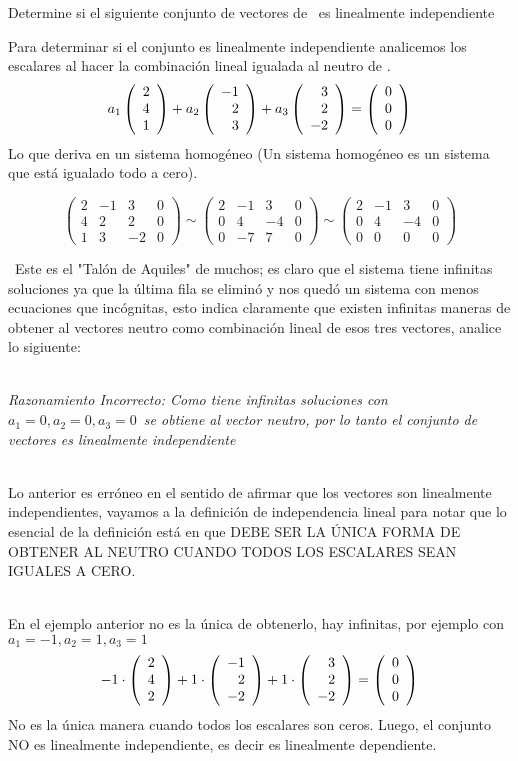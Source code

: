 \begin{ejemplo}
Determine si el siguiente conjunto de vectores de \rtres\ es linealmente independiente 
\end{ejemplo}
Para determinar si el conjunto es linealmente independiente analicemos los escalares al hacer la combinaci\'on lineal igualada al neutro de \rtres.
\[
a_1\left( \begin{array}{r} 2\\ 4\\ 1 \end{array} \right) +
a_2\left( \begin{array}{r} -1\\ 2\\ 3 \end{array} \right) +
a_3\left( \begin{array}{r} 3\\ 2\\ -2 \end{array} \right) =
\left( \begin{array}{r} 0\\ 0\\ 0 \end{array} \right) 
\]
Lo que deriva en un sistema homog\'eneo (Un sistema homog\'eneo es un sistema que est\'a igualado todo a cero).

\[
\left(
\begin{array}{rrr|r}
2&-1&3&0\\
4&2&2&0\\
1&3&-2&0
\end{array}
\right)
\sim
\left(
\begin{array}{rrr|r}
2&-1&3&0\\
0&4&-4&0\\
0&-7&7&0
\end{array}
\right)
\sim
\left(
\begin{array}{rrr|r}
2&-1&3&0\\
0&4&-4&0\\
0&0&0&0
\end{array}
\right)
\]

\obs\ Este es el "Tal\'on de Aquiles" de muchos; es claro que el sistema tiene infinitas soluciones ya que la \'ultima fila se elimin\'o y nos qued\'o un sistema con menos ecuaciones que inc\'ognitas, esto indica claramente que existen infinitas maneras de obtener al vectores neutro como combinaci\'on lineal de esos tres vectores, analice lo sigiuente:

~\\
\textsl{Razonamiento Incorrecto: 
Como tiene infinitas soluciones con $a_1=0, a_2=0, a_3=0$\ se obtiene al vector neutro, por lo tanto el conjunto de vectores es linealmente independiente}

~\\
Lo anterior es err\'oneo en el sentido de afirmar que los vectores son linealmente independientes,
vayamos a la definici\'on de independencia lineal para notar que lo esencial de la definici\'on est\'a en que DEBE SER LA \'UNICA FORMA DE OBTENER AL NEUTRO CUANDO TODOS LOS ESCALARES SEAN IGUALES A CERO.

~\\
En el ejemplo anterior no es la \'unica de obtenerlo, hay infinitas, por ejemplo con $a_1=-1, a_2=1, a_3=1$
\[-1\cdot\left( \begin{array}{r} 2\\ 4\\ 2 \end{array} \right) +
1\cdot\left( \begin{array}{r} -1\\ 2\\ -2 \end{array} \right) +
1\cdot\left( \begin{array}{r} 3\\ 2\\ -2 \end{array} \right) =
\left( \begin{array}{r} 0\\ 0\\ 0 \end{array} \right) 
\]
No es la \'unica manera cuando todos los escalares son ceros. Luego, el conjunto NO es linealmente independiente, es decir es linealmente dependiente.
